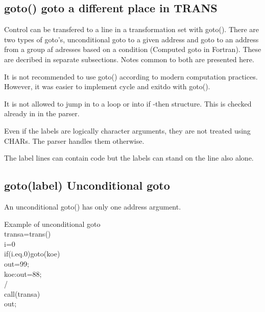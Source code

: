 \subsection{\textcolor{VioletRed}{goto}() goto a different place in TRANS}
\label{goto}
Control can be transfered to a line in a transformation set with \textcolor{VioletRed}{goto}().
There are two types of goto's, unconditional goto to a given address and goto
to an address from a group af adresses based on a condition (Computed goto in Fortran).
These are decribed in separate subsections. Notes common to both are presented here.
\begin{note}
It is not recommended to use \textcolor{VioletRed}{goto}() according to modern computation practices.
However, it was easier to implement cycle and exitdo with \textcolor{VioletRed}{goto}().
\end{note}
\begin{note}
It is not allowed to jump in to a loop or into if -then structure. This is
checked already in in the parser.
\end{note}
\begin{note}
Even if the labels are
logically character arguments, they are not treated using CHARs. The parser
handles them otherwise.
\end{note}
\begin{note}
The label lines can contain code but the labels can stand on the line also alone.
\end{note}
\subsection{\textcolor{VioletRed}{goto}(label) Unconditional goto}
\label{goto1}
An unconditional \textcolor{VioletRed}{goto}() has only one address argument.
\begin{example}[gotoex]Example of unconditional goto\\
\label{gotoex}
transa=\textcolor{VioletRed}{trans}()\\
i=0\\
\textcolor{VioletRed}{if}(i.eq.0)\textcolor{VioletRed}{goto}(koe)\\
out=99;\\
koe:out=88;\\
/\\
\textcolor{VioletRed}{call}(transa)\\
out;
\end{example}
